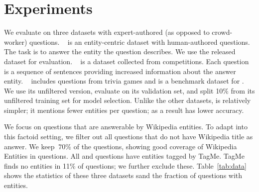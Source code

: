 \section{Experiments}
\label{sec:exp}

We evaluate on three datasets with expert-authored (as opposed to crowd-worker) questions.
%
\qblink~\cite{Elgohary:Zhao:Boyd-Graber-2018} is an entity-centric dataset with human-authored questions. 
The task is to answer the entity the question describes. We use the released dataset for evaluation.
%
\qanta~\cite{iyyer2014neural} is a  dataset collected from \qb{} competitions. 
Each question is a sequence of sentences providing increased information about the answer entity. 
%
\triviaqa~\cite{joshi2017triviaqa} includes questions from trivia
games and is a benchmark dataset for . We use its unfiltered
version, evaluate on its validation set, and split 10\% from its
unfiltered training set for model selection.
%
Unlike the other datasets, \triviaqa{} is relatively simpler; it
mentions fewer entities per question; as a result \name{} has lower
accuracy.





 

We focus on questions that are answerable by Wikipedia entities.  To
adapt \triviaqa{} into this factoid setting, we filter out all
questions that do not have Wikipedia title as answer. We keep $~70\%$
of the questions, showing good coverage of Wikipedia Entities
in questions.
%
All \qblink{} and \qanta{} questions have entities tagged by TagMe.
%
TagMe finds no entities in 11\% of \triviaqa{} questions; we further
exclude these.
%
Table~\ref{tab:data} shows the statistics of these three datasets 
sand the fraction of questions with entities.

